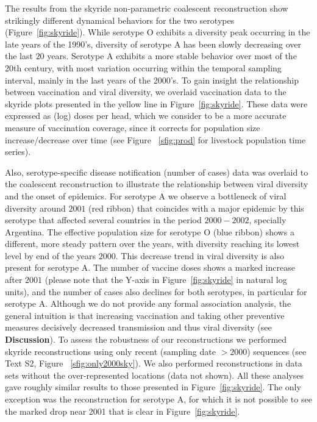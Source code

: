 \documentclass[10pt]{article}
\begin{document}
The results from the skyride non-parametric coalescent reconstruction show strikingly different dynamical behaviors for the two serotypes (Figure~\ref{fig:skyride}).
While serotype O exhibits a diversity peak occurring in the late years of the 1990's, diversity of serotype A has been slowly decreasing over the last $20$ years.
Serotype A exhibits a more stable behavior over most of the 20th century, with most variation occurring within the temporal sampling interval, mainly in the last years of the 2000's.
To gain insight the relationship between vaccination and viral diversity, we overlaid vaccination data to the skyride plots presented in the yellow line in Figure~\ref{fig:skyride}.
These data were expressed as (log) doses per head, which we consider to be a more accurate measure of vaccination coverage, since it corrects for population size increase/decrease over time (see Figure ~\ref{sfig:prod} for livestock population time series). 

Also, serotype-specific disease notification (number of cases) data was overlaid to the coalescent reconstruction to illustrate the relationship between viral diversity and the onset of epidemics. 
For serotype A we observe a bottleneck of viral diversity around $2001$ (red ribbon) that coincides with a major epidemic by this serotype that affected several countries in the period $2000-2002$, specially Argentina.
The effective population size for serotype O (blue ribbon) shows a different, more steady pattern over the years, with diversity reaching its lowest level by end of the years $2000$.
This decrease trend in viral diversity is also present for serotype A.
The number of vaccine doses shows a marked increase after $2001$ (please note that the Y-axis in Figure~\ref{fig:skyride} in natural log units), and the number of cases also declines for both serotypes, in particular for serotype A.
Although we do not provide any formal association analysis, the general intuition is that increasing vaccination and taking other preventive measures decisively decreased transmission and thus viral diversity (see \textbf{Discussion}).
To assess the robustness of our reconstructions we performed skyride reconstructions using only recent (sampling date $>2000$) sequences (see Text S2, Figure ~\ref{sfig:only2000sky}).
We also performed reconstructions in data sets without the over-represented locations (data not shown).
All these analyses gave roughly similar results to those presented in Figure~\ref{fig:skyride}.
The only exception was the reconstruction for serotype A, for which it is not possible to see the marked drop near 2001 that is clear in Figure~\ref{fig:skyride}. 
\end{document}
